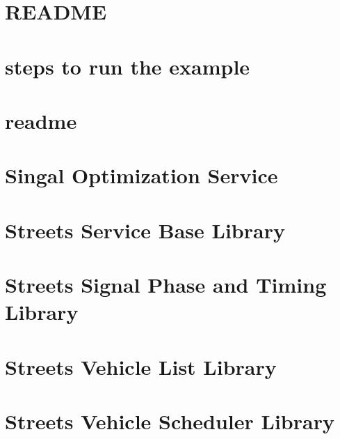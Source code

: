 \let\mypdfximage\pdfximage\def\pdfximage{\immediate\mypdfximage}\documentclass[twoside]{book}
\newcommand{\+}{\discretionary{\mbox{\scriptsize$\hookleftarrow$}}{}{}}
\begin{document}
\chapter{README}
\label{md_README}

\chapter{steps to run the example}
\label{md_scheduling_service_readme}

\chapter{readme}
\label{md_scripts_readme}

\chapter{Singal Optimization Service}
\label{md_signal_opt_service_readme}

\chapter{Streets Service Base Library}
\label{md_streets_utils_streets_service_base_README}

\chapter{Streets Signal Phase and Timing Library}
\label{md_streets_utils_streets_signal_phase_and_timing_README}

\chapter{Streets Vehicle List Library}
\label{md_streets_utils_streets_vehicle_list_README}

\chapter{Streets Vehicle Scheduler Library}
\label{md_streets_utils_streets_vehicle_scheduler_README}

\end{document}
